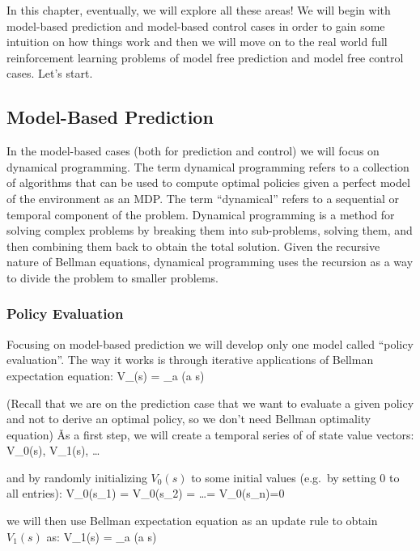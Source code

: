 In this chapter, eventually, we will explore all these areas! We will begin with model-based prediction and
model-based control cases in order to gain some intuition on how things work and then we will move on to the real
world full reinforcement learning problems of model free prediction and model free control cases. Let's start.

\subsection{Model-Based Prediction}

In the model-based cases (both for prediction and control) we will focus on dynamical programming. The term dynamical
programming refers to a collection of algorithms that can be used to compute optimal policies given a perfect model
of the environment as an MDP. The term ``dynamical'' refers to a sequential or temporal component of the problem.
Dynamical programming is a method for solving complex problems by breaking them into sub-problems, solving them, and
then combining them back to obtain the total solution. Given the recursive nature of Bellman equations, dynamical
programming uses the recursion as a way to divide the problem to smaller problems.

\subsubsection{Policy Evaluation}

Focusing on model-based prediction we will develop only one model called ``policy evaluation''. The way it works is
through iterative applications of Bellman expectation equation:
\bse
V_{\pi}(s) = \sum_{a} \pi(a \mid s) 
\ese

(Recall that we are on the prediction case that we want to evaluate a given policy and not to derive an optimal
policy, so we don't need Bellman optimality equation) \v

As a first step, we will create a temporal series of of state value vectors:
\bse
V_0(s), V_1(s), \ldots
\ese

and by randomly initializing $V_0(s)$ to some initial values (e.g.\ by setting 0 to all entries):
\bse
V_0(s_1) = V_0(s_2) = \ldots = V_0(s_n)=0
\ese

we will then use Bellman expectation equation as an update rule to obtain $V_1(s)$ as:
\bse
V_{1}(s) = \sum_{a} \pi(a \mid s) 
\ese

